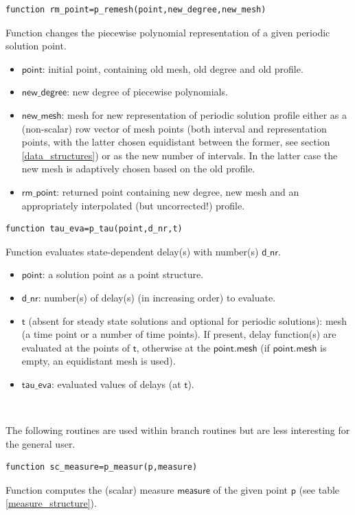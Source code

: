 \documentclass[10pt]{article}
\gdef \file#1{{\bfseries{\ttfamily{#1}}}}
\gdef \parm#1{{\mathsf{#1}}}
\begin{document}
{{\small\begin{verbatim}
function rm_point=p_remesh(point,new_degree,new_mesh)
\end{verbatim}}
\noindent Function \file{p\_remesh} changes the piecewise polynomial
representation of a given periodic solution point.
\begin{itemize}
\item $\parm{point}$: initial point, containing old mesh, old degree and
old profile.
\item $\parm{new\_degree}$: new degree of piecewise polynomials.
\item $\parm{new\_mesh}$: mesh for new representation of periodic solution
profile either as a (non-scalar) row vector of mesh points 
(both interval and representation
points, with the latter chosen equidistant between the
former, see section \ref{data_structures}) or as the new number of intervals.
In the latter case the new mesh is adaptively chosen based on the old
profile. 
\item $\parm{rm\_point}$: 
returned point containing new degree, new mesh and an 
appropriately interpolated
(but uncorrected!) profile.
\end{itemize} 

{\small\begin{verbatim}
function tau_eva=p_tau(point,d_nr,t)
\end{verbatim}}
\noindent Function \file{p\_tau} evaluates state-dependent delay(s) 
with number(s) $\parm{d\_nr}$. 
\begin{itemize}
\item $\parm{point}$: a solution point as a point structure.
\item $\parm{d\_nr}$: number(s) of delay(s) (in increasing order) 
to evaluate.
\item $\parm{t}$ (absent for steady state solutions and optional
for periodic solutions): mesh (a time point or a number of time 
points). If present,
delay function(s) are evaluated at the points of 
$\parm{t}$, otherwise at the
$\parm{point.mesh}$ (if $\parm{point.mesh}$ is empty, an equidistant 
mesh is used).
\item $\parm{tau\_eva}$: evaluated values of delays (at $\parm{t}$). 
\end{itemize}
\ 

The following routines are used within branch routines but
are less interesting for the general user.

{\small\begin{verbatim}
function sc_measure=p_measur(p,measure)
\end{verbatim}}
\noindent Function \file{p\_measur} computes the (scalar) measure $\parm{measure}$
of the given point $\parm{p}$ (see table \ref{measure_structure}). 

}
\end{document}
